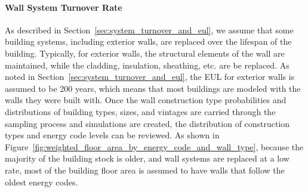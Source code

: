 %

\paragraph{Wall System Turnover Rate}
As described in Section~\ref{sec:system_turnover_and_eul}, we assume that some building systems, including exterior walls, are replaced over the lifespan of the building. Typically, for exterior walls, the structural elements of the wall are maintained, while the cladding, insulation, sheathing, etc. are be replaced. As noted in Section~\ref{sec:system_turnover_and_eul}, the EUL for exterior walls is assumed to be 200 years, which means that most buildings are modeled with the walls they were built with. Once the wall construction type probabilities and distributions of building types, sizes, and vintages are carried through the sampling process and simulations are created, the distribution of construction types and energy code levels can be reviewed. As shown in Figure~\ref{fig:weighted_floor_area_by_energy_code_and_wall_type}, because the majority of the building stock is older, and wall systems are replaced at a low rate, most of the building floor area is assumed to have walls that follow the oldest energy codes.

